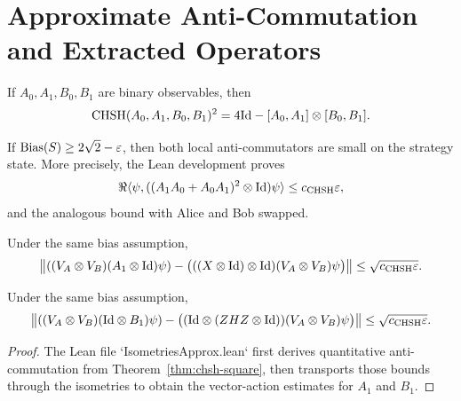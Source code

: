 \section{Approximate Anti-Commutation and Extracted Operators}

\begin{theorem}
\label{thm:chsh-square}
If $A_0,A_1,B_0,B_1$ are binary observables, then
\[
\mathrm{CHSH}(A_0,A_1,B_0,B_1)^2
= 4 \mathrm{Id} - [A_0,A_1] \otimes [B_0,B_1].
\]
\end{theorem}

\begin{theorem}
\label{thm:approx-anticomm}
If $\operatorname{Bias}(S) \ge 2\sqrt{2} - \varepsilon$, then both local anti-commutators are small on the strategy state.
More precisely, the Lean development proves
\[
\Re \langle \psi, ((A_1A_0 + A_0A_1)^2 \otimes \mathrm{Id})\psi \rangle \le c_{\mathrm{CHSH}} \varepsilon,
\]
and the analogous bound with Alice and Bob swapped.
\end{theorem}

\begin{theorem}
\label{thm:a1-approx}
Under the same bias assumption,
\[
\left\lVert 
((V_A \otimes V_B)(A_1 \otimes \mathrm{Id})\psi)
-
\bigl(((X \otimes \mathrm{Id})\otimes \mathrm{Id})(V_A \otimes V_B)\psi\bigr)
 \right\rVert
\le \sqrt{c_{\mathrm{CHSH}} \varepsilon}.
\]
\end{theorem}

\begin{theorem}
\label{thm:b1-approx}
Under the same bias assumption,
\[
\left\lVert 
((V_A \otimes V_B)(\mathrm{Id} \otimes B_1)\psi)
-
\bigl((\mathrm{Id} \otimes (ZHZ \otimes \mathrm{Id}))(V_A \otimes V_B)\psi\bigr)
 \right\rVert
\le \sqrt{c_{\mathrm{CHSH}} \varepsilon}.
\]
\end{theorem}

\begin{proof}
The Lean file `IsometriesApprox.lean` first derives quantitative anti-commutation from
Theorem~\ref{thm:chsh-square}, then transports those bounds through the isometries to obtain the vector-action estimates for $A_1$ and $B_1$.
\end{proof}
